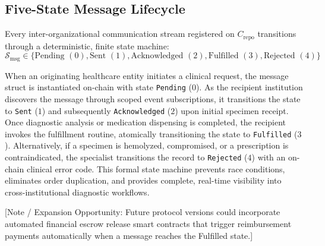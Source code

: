 \subsection{Five-State Message Lifecycle}
Every inter-organizational communication stream registered on $C_{\text{repo}}$ transitions through a deterministic, finite state machine:
\begin{equation}
\mathcal{S}_{\text{msg}} \in \{\text{Pending } (0), \text{Sent } (1), \text{Acknowledged } (2), \text{Fulfilled } (3), \text{Rejected } (4)\}
\end{equation}

When an originating healthcare entity initiates a clinical request, the message struct is instantiated on-chain with state \texttt{Pending} ($0$). As the recipient institution discovers the message through scoped event subscriptions, it transitions the state to \texttt{Sent} ($1$) and subsequently \texttt{Acknowledged} ($2$) upon initial specimen receipt. Once diagnostic analysis or medication dispensing is completed, the recipient invokes the fulfillment routine, atomically transitioning the state to \texttt{Fulfilled} ($3$). Alternatively, if a specimen is hemolyzed, compromised, or a prescription is contraindicated, the specialist transitions the record to \texttt{Rejected} ($4$) with an on-chain clinical error code. This formal state machine prevents race conditions, eliminates order duplication, and provides complete, real-time visibility into cross-institutional diagnostic workflows.

[Note / Expansion Opportunity: Future protocol versions could incorporate automated financial escrow release smart contracts that trigger reimbursement payments automatically when a message reaches the Fulfilled state.]

